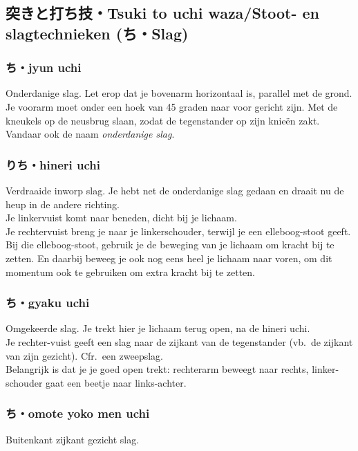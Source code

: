 \subsection{突きと打ち技・Tsuki to uchi waza/Stoot- en slagtechnieken ({\bfseries{}ち・Slag})}
\subsubsection{ち・jyun uchi}
Onderdanige slag. Let erop dat je bovenarm horizontaal is, parallel met de grond. Je voorarm moet onder een hoek van 45 graden naar voor gericht zijn. Met de kneukels op de neusbrug slaan, zodat de tegenstander op zijn knieën zakt. Vandaar ook de naam \textit{onderdanige slag}.

\subsubsection{りち・hineri uchi}
Verdraaide inworp slag. Je hebt net de onderdanige slag gedaan en draait nu de heup in de andere richting.\\
Je linkervuist komt naar beneden, dicht bij je lichaam.\\
Je rechtervuist breng je naar je linkerschouder, terwijl je een elleboog-stoot geeft.\\
Bij die elleboog-stoot, gebruik je de beweging van je lichaam om kracht bij te zetten. En daarbij beweeg je ook nog eens heel je lichaam naar voren, om dit momentum ook te gebruiken om extra kracht bij te zetten.

\subsubsection{ち・gyaku uchi}
Omgekeerde slag. Je trekt hier je lichaam terug open, na de hineri uchi.\\
Je rechter-vuist geeft een slag naar de zijkant van de tegenstander (vb.\ de zijkant van zijn gezicht). Cfr.\ een zweepslag.\\
Belangrijk is dat je je goed open trekt: rechterarm beweegt naar rechts, linker-schouder gaat een beetje naar links-achter.

\subsubsection{ち・omote yoko men uchi}
Buitenkant zijkant gezicht slag.

